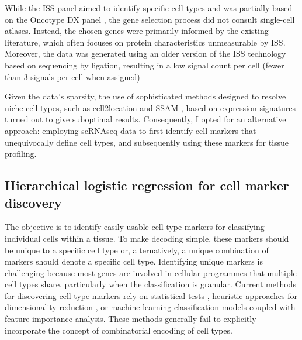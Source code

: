 While the \ac{ISS} panel aimed to identify specific cell types and was partially based on the Oncotype DX panel \parencite{Paik2004-aq}, the gene selection process did not consult single-cell atlases. Instead, the chosen genes were primarily informed by the existing literature, which often focuses on protein characteristics unmeasurable by \ac{ISS}. Moreover, the data was generated using an older version of the \ac{ISS} technology based on sequencing by ligation, resulting in a low signal count per cell (fewer than 3 signals per cell when assigned) 

Given the data's sparsity, the use of sophisticated methods designed to resolve niche cell types, such as cell2location \parencite{Kleshchevnikov2022-ub} and SSAM \parencite{Park2021-hi}, based on expression signatures turned out to give suboptimal results. Consequently, I opted for an alternative approach: employing \ac{scRNAseq} data to first identify cell markers that unequivocally define cell types, and subsequently using these markers for tissue profiling.

\subsection{Hierarchical logistic regression for cell marker discovery}
\label{sec:modalities-schierarchy}


The objective is to identify easily usable cell type markers for classifying individual cells within a tissue. To make decoding simple, these markers should be unique to a specific cell type or, alternatively, a unique combination of markers should denote a specific cell type. Identifying unique markers is challenging because most genes are involved in cellular programmes that multiple cell types share, particularly when the classification is granular. Current methods for discovering cell type markers rely on statistical tests \parencite{Wolf2018-kx}, heuristic approaches for dimensionality reduction \parencite{Dumitrascu2021-dg, Dai2022-ve, Missarova2021-vg}, or machine learning classification models \parencite{Nelson2022-vg} coupled with feature importance analysis. These methods generally fail to explicitly incorporate the concept of combinatorial encoding of cell types.

